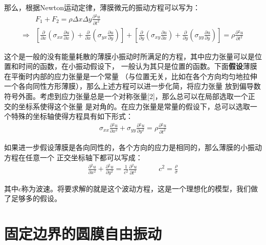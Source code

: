 \documentclass[a4paper]{ctexart}
\newcommand{\pdv}[2]{\frac{\partial{#1}}{\partial{#2}}}
\begin{document}
	\par 那么，根据Newton运动定律，薄膜微元的振动方程可以写为：
	\begin{align}
		&F_{1} + F_{2} = \rho \Delta x\Delta y \pdv{^{2}u}{t^{2}}\\
		\Rightarrow& \left[\pdv{}{x}\left(\sigma_{xx}\pdv{u}{x}\right) + \pdv{}{x}\left(\sigma_{yx}\pdv{u}{y}\right)\right] + 
		\left[\pdv{}{y}\left(\sigma_{xy}\pdv{u}{x}\right) + \pdv{}{y}\left(\sigma_{yy}\pdv{u}{y}\right)\right] = \rho\pdv{^2 u}{t^{2}}
	\end{align}
	\par 这个是一般的没有能量耗散的薄膜小振动时所满足的方程，其中应力张量可以是位置和时间的函数，在小振动假设下，
	一般认为其只是位置的函数。下面\textbf{假设}薄膜在平衡时内部的应力张量是一个常量
	（与位置无关，比如在各个方向均匀地拉伸一个各向同性方形薄膜），那么上述方程可以进一步化简，将应力张量
	放到偏导数符号外面。考虑到应力张量总是一个对称张量[2]，那么总可以在局部选取一个正交的坐标系使得这个张量
	是对角的。在应力张量是常量的假设下，总可以选取一个特殊的坐标轴使得方程具有如下形式：
	\begin{align}
		\sigma_{xx}\pdv{^{2}u}{x^{2}} + \sigma_{yy}\pdv{^2 u}{y^2} = \rho \pdv{^{2}u}{t^{2}}
	\end{align}
	\par 如果进一步假设薄膜是各向同性的，各个方向的应力是相同的，那么薄膜的小振动方程在任意一个
	正交坐标轴下都可以写成：
	\begin{align}
		\pdv{^2 u}{x^2} + \pdv{^{2}u}{y^{2}} = \frac{1}{c^{2}}\pdv{^2 u}{t^2}\quad\quad\quad c^2 = \frac{\rho}{\sigma}
	\end{align}
	\par 其中$c$称为波速。将要求解的就是这个波动方程，这是一个理想化的模型，我们做了足够多的假设。
	\section{固定边界的圆膜自由振动}
\end{document}
